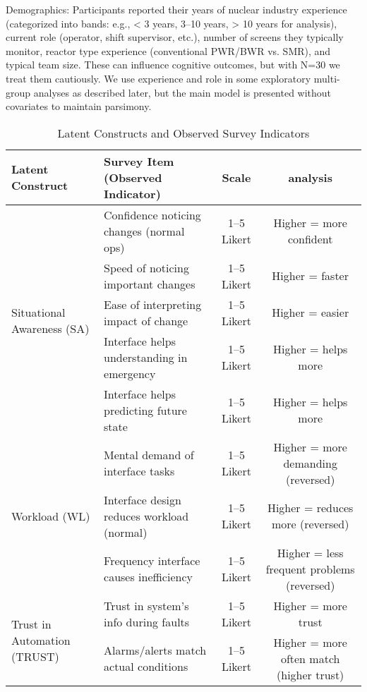 \documentclass[conference]{IEEEtran}
\begin{document}
Demographics: Participants reported their years of nuclear industry experience (categorized into bands: e.g., < 3 years, 3–10 years, > 10 years for analysis), current role (operator, shift supervisor, etc.), number of screens they typically monitor, reactor type experience (conventional PWR/BWR vs. SMR), and typical team size. These can influence cognitive outcomes, but with N=30 we treat them cautiously. We use experience and role in some exploratory multi-group analyses as described later, but the main model is presented without covariates to maintain parsimony.

\begin{table*}[t]
\caption{Latent Constructs and Observed Survey Indicators}
\centering
\begin{tabular}{llcc}
\toprule
Latent Construct & Survey Item (Observed Indicator) & Scale & analysis \\
\midrule
\multirow{5}{*}{Situational Awareness (SA)} & Confidence noticing changes (normal ops) & 1–5 Likert & Higher = more confident \\
 & Speed of noticing important changes & 1–5 Likert & Higher = faster \\
 & Ease of interpreting impact of change & 1–5 Likert & Higher = easier \\
 & Interface helps understanding in emergency & 1–5 Likert & Higher = helps more \\
 & Interface helps predicting future state & 1–5 Likert & Higher = helps more \\
\midrule
\multirow{3}{*}{Workload (WL)} & Mental demand of interface tasks & 1–5 Likert & Higher = more demanding (reversed) \\
 & Interface design reduces workload (normal) & 1–5 Likert & Higher = reduces more (reversed) \\
 & Frequency interface causes inefficiency & 1–5 Likert & Higher = less frequent problems (reversed) \\
\midrule
\multirow{2}{*}{Trust in Automation (TRUST)} & Trust in system’s info during faults & 1–5 Likert & Higher = more trust \\
 & Alarms/alerts match actual conditions & 1–5 Likert & Higher = more often match (higher trust) \\
\bottomrule
\end{tabular}
\label{tab:constructs}
\end{table*}
\end{document}
